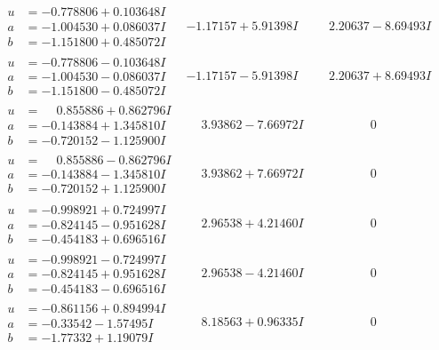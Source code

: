\documentclass[1p]{elsarticle_modified}
\theoremstyle{definition}
\begin{document}
$$\begin{array}{c|c|c}
\begin{aligned}
u &= -0.778806 + 0.103648 I \\
a &= -1.004530 + 0.086037 I \\
b &= -1.151800 + 0.485072 I\end{aligned}
 & -1.17157 + 5.91398 I & \phantom{-}2.20637 - 8.69493 I \\ \hline\begin{aligned}
u &= -0.778806 - 0.103648 I \\
a &= -1.004530 - 0.086037 I \\
b &= -1.151800 - 0.485072 I\end{aligned}
 & -1.17157 - 5.91398 I & \phantom{-}2.20637 + 8.69493 I \\ \hline\begin{aligned}
u &= \phantom{-}0.855886 + 0.862796 I \\
a &= -0.143884 + 1.345810 I \\
b &= -0.720152 - 1.125900 I\end{aligned}
 & \phantom{-}3.93862 - 7.66972 I & \phantom{-0.000000 } 0 \\ \hline\begin{aligned}
u &= \phantom{-}0.855886 - 0.862796 I \\
a &= -0.143884 - 1.345810 I \\
b &= -0.720152 + 1.125900 I\end{aligned}
 & \phantom{-}3.93862 + 7.66972 I & \phantom{-0.000000 } 0 \\ \hline\begin{aligned}
u &= -0.998921 + 0.724997 I \\
a &= -0.824145 - 0.951628 I \\
b &= -0.454183 + 0.696516 I\end{aligned}
 & \phantom{-}2.96538 + 4.21460 I & \phantom{-0.000000 } 0 \\ \hline\begin{aligned}
u &= -0.998921 - 0.724997 I \\
a &= -0.824145 + 0.951628 I \\
b &= -0.454183 - 0.696516 I\end{aligned}
 & \phantom{-}2.96538 - 4.21460 I & \phantom{-0.000000 } 0 \\ \hline\begin{aligned}
u &= -0.861156 + 0.894994 I \\
a &= -0.33542 - 1.57495 I \\
b &= -1.77332 + 1.19079 I\end{aligned}
 & \phantom{-}8.18563 + 0.96335 I & \phantom{-0.000000 } 0 \\ \hline\begin{aligned}

\end{aligned}
\end{array}$$
\end{document}
